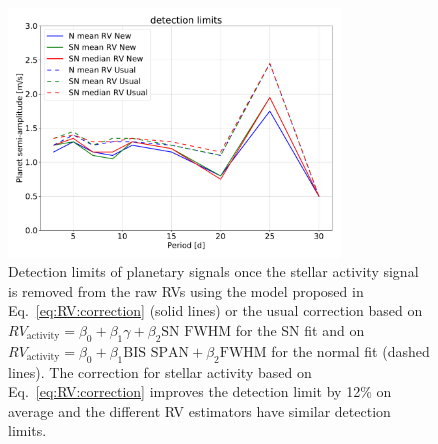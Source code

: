 \documentclass{aa}
\newcommand{\jessi}[1]{{\color{Purple}[[\textbf{Jessi: }#1]]}}
\begin{document}
\begin{figure}[!h]
\begin{center}
\includegraphics[height = 2.6in]{detection_limits.pdf} 
   \caption{Detection limits of planetary signals once the stellar activity signal is removed from the raw RVs using the model proposed in Eq.~\eqref{eq:RV:correction} (solid lines) or the usual correction based on $RV_{\text{activity}}=\beta_0+\beta_1 \gamma + \beta_2 \text{SN FWHM}$ for the SN fit and on $RV_{\text{activity}}=\beta_0+\beta_1 \text{BIS SPAN} + \beta_2 \text{FWHM}$ for the normal fit (dashed lines). The correction for stellar activity based on Eq.~\eqref{eq:RV:correction} improves the detection limit by 12\% on average and the different RV estimators have similar detection limits.}
   \label{fig:detection_limits}
\end{center}
\end{figure}

%

\end{document}
